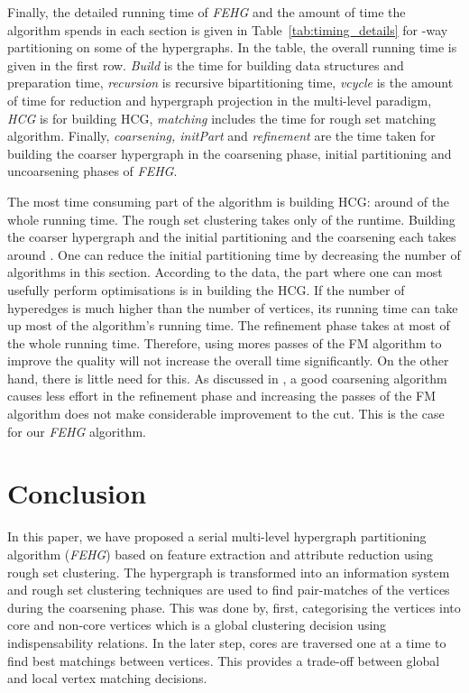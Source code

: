 \documentclass[twocolumn]{svjour3}          \smartqed
\begin{document}
Finally, the detailed running time of \textit{FEHG} and the amount of time the algorithm spends in each section is given in Table~\ref{tab:timing_details} for -way partitioning on some of the hypergraphs. In the table, the overall running time is given in the first row. \textit{Build} is the time for building data structures and preparation time, \textit{recursion} is recursive bipartitioning time, \textit{vcycle} is the amount of time for reduction and hypergraph projection in the multi-level paradigm, \textit{HCG} is for building HCG, \textit{matching} includes the time for rough set matching algorithm. Finally, 
\textit{coarsening, initPart} and \textit{refinement} are the time taken for building the coarser hypergraph in the coarsening phase, initial partitioning and uncoarsening phases of \textit{FEHG}. 

The most time consuming part of the algorithm is building HCG: around  of the whole running time. The rough set clustering takes only  of the runtime. Building the coarser hypergraph and the initial partitioning and the coarsening each takes around . One can reduce the initial partitioning time by decreasing the number of algorithms in this section. According to the data, the part where one can most usefully perform optimisations is in building the HCG.  If the number of hyperedges is much higher than the number of vertices, its running time can take up most of the algorithm's running time. The refinement phase takes at most  of the whole running time. Therefore, using mores passes of the FM algorithm to improve the quality will not increase the overall time significantly. On the other hand, there is little need for this. As discussed in \cite{karytech2002}, a good coarsening algorithm causes less effort in the refinement phase and increasing the passes of the FM algorithm does not make considerable improvement to the cut. This is the case for our \textit{FEHG} algorithm. 


\section{Conclusion}\label{sec:conclusion}

In this paper, we have proposed a serial multi-level hypergraph partitioning algorithm (\textit{FEHG}) based on feature extraction and attribute reduction using rough set clustering. The hypergraph is transformed into an information system and rough set clustering techniques are used to find pair-matches of the vertices during the coarsening phase. This was done by, first, categorising the vertices into core and non-core vertices which is a global clustering decision using indispensability relations. In the later step, cores are traversed one at a time to find best matchings between vertices. This provides a trade-off between global and local vertex matching decisions.
\end{document}
